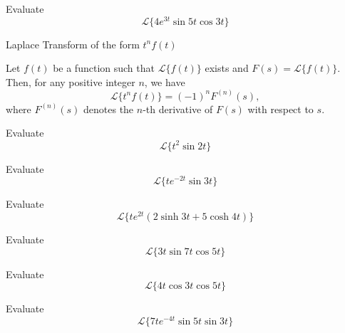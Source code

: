 \documentclass[12pt, a4paper]{article}
\begin{document}
\clearpage

\begin{problem}
	Evaluate \[\mathcal{L}\{4e^{3t} \sin 5t \cos 3t\}\] 
\end{problem}

\clearpage

\begin{heading}
	Laplace Transform of the form $t^n f(t)$
\end{heading}

\vspace{10pt}

\begin{theorem}
	Let $f(t)$ be a function such that $\mathcal{L}\{f(t)\}$ exists and $F(s) = \mathcal{L}\{f(t)\}$. Then, for any positive integer $n$, we have
	\[
	\mathcal{L}\{t^n f(t)\} = (-1)^n F^{(n)}(s),
	\]
	where $F^{(n)}(s)$ denotes the $n$-th derivative of $F(s)$ with respect to $s$.
\end{theorem}

\clearpage

\begin{problem}
	Evaluate \[\mathcal{L}\{t^2\sin 2t\}\] 
\end{problem}

\clearpage

\begin{problem}
	Evaluate \[\mathcal{L}\{t e^{-2t}\sin 3t\}\] 
\end{problem}

\clearpage

\begin{problem}
	Evaluate \[\mathcal{L}\{t e^{2t}(2\sinh 3t + 5\cosh 4t)\}\] 
\end{problem}

\clearpage

\begin{problem}
	Evaluate \[\mathcal{L}\{3t\sin 7t \cos 5t\}\] 
\end{problem}

\clearpage

\begin{problem}
	Evaluate \[\mathcal{L}\{4t\cos 3t \cos 5t\}\] 
\end{problem}

\clearpage

\begin{problem}
	Evaluate \[\mathcal{L}\{7t e^{-4t}\sin 5t \sin 3t\}\] 
\end{problem}







\EndPage
\end{document}
